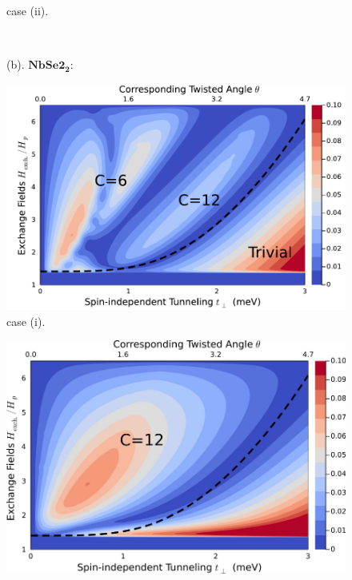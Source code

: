 \begin{figure}[!htp]
\begin{minipage}{1.0\textwidth}
\begin{minipage}{0.45\textwidth}
			case (ii).\\
		\end{minipage}
	\end{minipage}
	\\[1em]
	\begin{minipage}{1.0\textwidth}
		\RaggedRight (b). $\mathbf{NbSe2_2:}$\\[0.5em]
		\begin{minipage}{0.45\textwidth}
			\centering
			\includegraphics[width=\linewidth]{contents/Ising_Top/figures/pdf_files/Gap_Size_Phase_Diagram.NbSe2.t_H.magnetic_with_prediction.pdf}\\
			case (i).
		\end{minipage}
		\hspace{1em}
		\begin{minipage}{0.45\textwidth}
			\centering
			\includegraphics[width=\linewidth]{contents/Ising_Top/figures/pdf_files/Gap_Size_Phase_Diagram.NbSe2.t_H.non-magnetic_with_prediction.pdf}\\

\end{minipage}
\end{minipage}
\end{figure}
